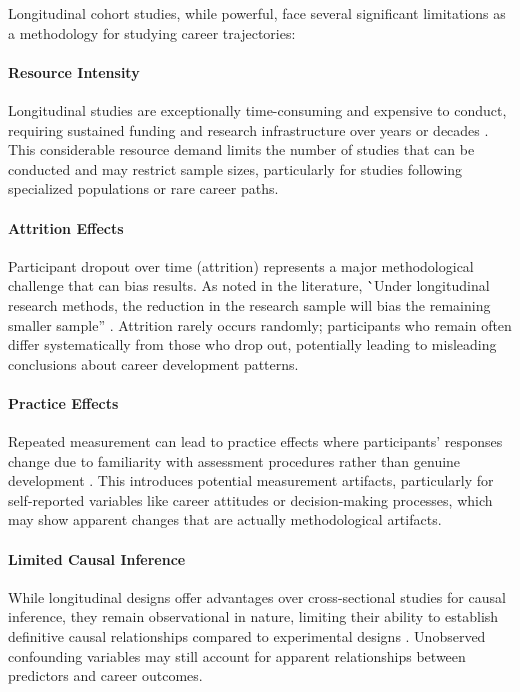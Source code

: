 \documentclass[../main.tex]{subfiles}
\begin{document}
Longitudinal cohort studies, while powerful, face several significant limitations as a methodology for studying career trajectories:

\paragraph{Resource Intensity}
Longitudinal studies are exceptionally time-consuming and expensive to conduct, requiring sustained funding and research infrastructure over years or decades \parencite{wikipedia2024longitudinal}. This considerable resource demand limits the number of studies that can be conducted and may restrict sample sizes, particularly for studies following specialized populations or rare career paths.

\paragraph{Attrition Effects}
Participant dropout over time (attrition) represents a major methodological challenge that can bias results. As noted in the literature, \``Under longitudinal research methods, the reduction in the research sample will bias the remaining smaller sample'' \parencite{wikipedia2024longitudinal}. Attrition rarely occurs randomly; participants who remain often differ systematically from those who drop out, potentially leading to misleading conclusions about career development patterns.

\paragraph{Practice Effects}
Repeated measurement can lead to practice effects where participants' responses change due to familiarity with assessment procedures rather than genuine development \parencite{wikipedia2024longitudinal}. This introduces potential measurement artifacts, particularly for self-reported variables like career attitudes or decision-making processes, which may show apparent changes that are actually methodological artifacts.

\paragraph{Limited Causal Inference}
While longitudinal designs offer advantages over cross-sectional studies for causal inference, they remain observational in nature, limiting their ability to establish definitive causal relationships compared to experimental designs \parencite{wikipedia2024longitudinal}. Unobserved confounding variables may still account for apparent relationships between predictors and career outcomes.
\end{document}
